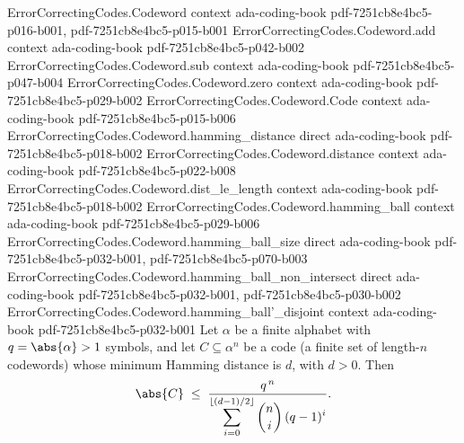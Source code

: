 \begin{theorem}
\label{ErrorCorrectingCodes.Codeword.hamming_bound}
\leanok
{}
\proofstep
  {ErrorCorrectingCodes.Codeword}
  {context}
  {ada-coding-book}
  {pdf-7251cb8e4bc5-p016-b001,
    pdf-7251cb8e4bc5-p015-b001}
\proofstep
  {ErrorCorrectingCodes.Codeword.add}
  {context}
  {ada-coding-book}
  {pdf-7251cb8e4bc5-p042-b002}
\proofstep
  {ErrorCorrectingCodes.Codeword.sub}
  {context}
  {ada-coding-book}
  {pdf-7251cb8e4bc5-p047-b004}
\proofstep
  {ErrorCorrectingCodes.Codeword.zero}
  {context}
  {ada-coding-book}
  {pdf-7251cb8e4bc5-p029-b002}
\proofstep
  {ErrorCorrectingCodes.Codeword.Code}
  {context}
  {ada-coding-book}
  {pdf-7251cb8e4bc5-p015-b006}
\proofstep
  {ErrorCorrectingCodes.Codeword.hamming_distance}
  {direct}
  {ada-coding-book}
  {pdf-7251cb8e4bc5-p018-b002}
\proofstep
  {ErrorCorrectingCodes.Codeword.distance}
  {context}
  {ada-coding-book}
  {pdf-7251cb8e4bc5-p022-b008}
\proofstep
  {ErrorCorrectingCodes.Codeword.dist_le_length}
  {context}
  {ada-coding-book}
  {pdf-7251cb8e4bc5-p018-b002}
\proofstep
  {ErrorCorrectingCodes.Codeword.hamming_ball}
  {context}
  {ada-coding-book}
  {pdf-7251cb8e4bc5-p029-b006}
\proofstep
  {ErrorCorrectingCodes.Codeword.hamming_ball_size}
  {direct}
  {ada-coding-book}
  {pdf-7251cb8e4bc5-p032-b001,
    pdf-7251cb8e4bc5-p070-b003}
\proofstep
  {ErrorCorrectingCodes.Codeword.hamming_ball_non_intersect}
  {direct}
  {ada-coding-book}
  {pdf-7251cb8e4bc5-p032-b001,
    pdf-7251cb8e4bc5-p030-b002}
\proofstep
  {ErrorCorrectingCodes.Codeword.hamming_ball'_disjoint}
  {context}
  {ada-coding-book}
  {pdf-7251cb8e4bc5-p032-b001}
Let $\alpha$ be a finite alphabet with $q = \abs{\alpha} > 1$ symbols, and let $C
\subseteq \alpha^n$ be a code (a finite set of length-$n$ codewords) whose minimum
Hamming distance is $d$, with $d > 0$. Then
\[
\abs{C} \;\le\; \frac{q^{\,n}}{\displaystyle\sum_{i=0}^{\lfloor (d-1)/2 \rfloor}
\binom{n}{i}\,(q-1)^{i}}.
\]
\end{theorem}
